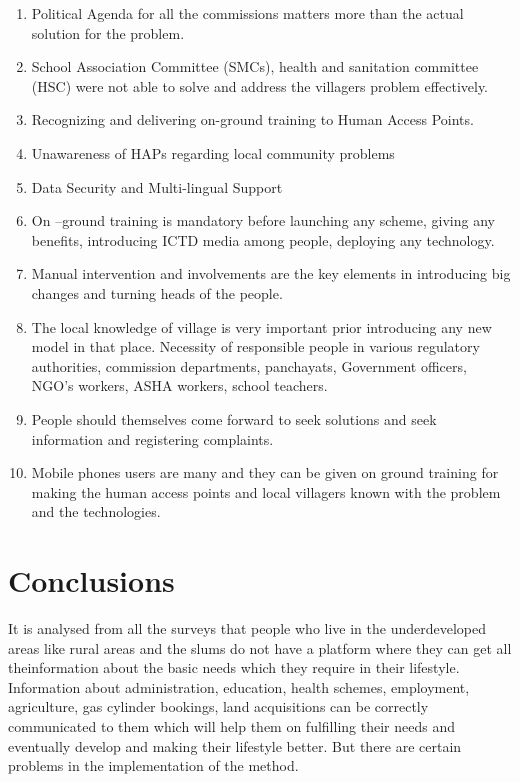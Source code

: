 \begin{enumerate}
\item Political Agenda for all the commissions matters more than the actual solution for the problem.
\item School Association Committee (SMCs), health and sanitation committee (HSC) were not able to solve and address the villagers problem effectively.
\item Recognizing and delivering on-ground training to Human Access Points.
\item Unawareness of HAPs regarding local community problems
\item Data Security and Multi-lingual Support
\item On –ground training is mandatory before launching any scheme, giving any
benefits, introducing ICTD media among people, deploying any technology.
\item Manual intervention and involvements are the key elements in introducing
big changes and turning heads of the people.
\item The local knowledge of village is very important prior introducing any new
model in that place.
Necessity of responsible people in various regulatory authorities, commission
departments, panchayats, Government officers, NGO’s workers, ASHA
workers, school teachers.
\item People should themselves come forward to seek solutions and seek
information and registering complaints.
\item Mobile phones users are many and they can be given on ground training for
making the human access points and local villagers known with the problem
and the technologies.
\end{enumerate}

\section {Conclusions}
It is analysed from all the surveys that people who live in the underdeveloped areas
like rural areas and the slums do not have a platform where they can get all theinformation about the basic needs which they require in their lifestyle. Information
about administration, education, health schemes, employment, agriculture, gas
cylinder bookings, land acquisitions can be correctly communicated to them which
will help them on fulfilling their needs and eventually develop and making their
lifestyle better. But there are certain problems in the implementation of the
method.


